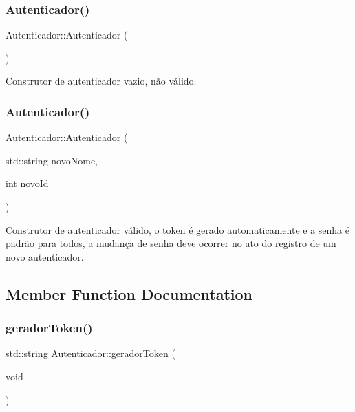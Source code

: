 \subsubsection{Autenticador()\hspace{0.1cm}{\footnotesize\ttfamily [1/2]}}
{\footnotesize\ttfamily Autenticador\+::\+Autenticador (\begin{DoxyParamCaption}{ }\end{DoxyParamCaption})\hspace{0.3cm}{\ttfamily [inline]}}

Construtor de autenticador vazio, não válido. \mbox{\label{class_autenticador_a4891aba543013dd7ef8ec2fbf9a20111}} 
\subsubsection{Autenticador()\hspace{0.1cm}{\footnotesize\ttfamily [2/2]}}
{\footnotesize\ttfamily Autenticador\+::\+Autenticador (\begin{DoxyParamCaption}\item[{std\+::string}]{novo\+Nome,  }\item[{int}]{novo\+Id }\end{DoxyParamCaption})\hspace{0.3cm}{\ttfamily [inline]}}

Construtor de autenticador válido, o token é gerado automaticamente e a senha é padrão para todos, a mudança de senha deve ocorrer no ato do registro de um novo autenticador. 

\subsection{Member Function Documentation}
\mbox{\label{class_autenticador_a5a02663a4c6b5cdb9330c5f36b9dbafe}} 
\subsubsection{gerador\+Token()}
{\footnotesize\ttfamily std\+::string Autenticador\+::gerador\+Token (\begin{DoxyParamCaption}\item[{void}]{ }\end{DoxyParamCaption})\hspace{0.3cm}{\ttfamily [inline]}}

